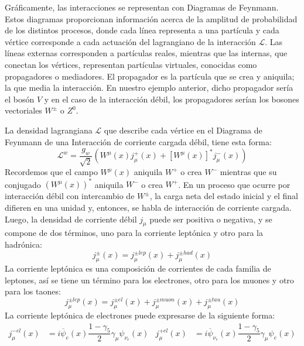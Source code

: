 Gráficamente, las interacciones se representan con Diagramas de Feynmann. Estos diagramas proporcionan información acerca de la amplitud de probabilidad de los distintos procesos, donde cada línea representa a una partícula y cada vértice corresponde a cada actuación del lagrangiano de la interacción $\mathcal{L}$. Las líneas externas corresponden a partículas reales, mientras que las internas, que conectan los vértices, representan partículas virtuales, conocidas como propagadores o mediadores. El propagador es la partícula que se crea y aniquila; la que media la interacción. \cite{notas2020} En nuestro ejemplo anterior, dicho propagador sería el bosón $V$ y en el caso de la interacción débil, los propagadores serían los bosones vectoriales $W^{\pm}$ o $Z^0$.

La densidad lagrangiana $\mathcal{L}$ que describe cada vértice en el Diagrama de Feynmann de una Interacción de corriente cargada débil, tiene esta forma:
\begin{equation}
\mathcal{L}^{w}=\dfrac{g_{w}}{\sqrt{2}}\left( W^{\mu }\left( x\right) j_{\mu}^{+}\left( x\right) +\left[ W^{\mu }\left( x\right) \right]^{\ast }j_{\mu}^{-}\left( x\right) \right)\label{eq:weak_lagrangian}
\end{equation}
Recordemos que el campo $W^{\mu}(x)$ aniquila $W^{+}$ o crea $W^{-}$ mientras que su conjugado $\left(W^{\mu}(x)\right)^\ast$ aniquila $W^{-}$ o crea $W^{+}$. En un proceso que ocurre por interacción débil con intercambio de $W^{\pm}$, la carga neta del estado inicial y el final difieren en una unidad y, entonces, se habla de interacción de corriente cargada. Luego, la densidad de corriente débil $j_{\mu}$ puede ser positiva o negativa, y se compone de dos términos, uno para la corriente leptónica y otro para la hadrónica:
\begin{equation}
j_{\mu} ^{\pm }\left( x\right) =j_{\mu} ^{\pm lep}\left( x\right) +j_{\mu} ^{\pm had}\left( x\right) \label{eq:weak_current_hadylep}
\end{equation}
La corriente leptónica es una composición de corrientes de cada familia de leptones, así se tiene un término para los electrones, otro para los muones y otro para los taones:
\begin{equation}
j_{\mu }^{\pm lep}\left( x\right) =j_{\mu }^{\pm el}\left( x\right) +j_{\mu }^{\pm muon}\left( x\right) +j_{\mu} ^{\pm tau}\left( x\right)\label{eq:leptonic_weak_current}
\end{equation}
La corriente leptónica de electrones puede expresarse de la siguiente forma:
\begin{align}
j_{\mu }^{-el}\left(x\right)&=i\overline{\psi}_{e}\left( x\right) \dfrac{1-\gamma_{5}}{2}\gamma _{\mu }\psi_{{ \nu}_{e}}\left( x\right) & j_{\mu}^{+el}\left(x\right)&= i\overline{\psi}_{{\nu}_{e}}\left(x\right) \dfrac{1-\gamma_{5}}{2}\gamma _{\mu}\psi_{e}\left( x\right)\label{eq:electric_weak_current}
\end{align}
